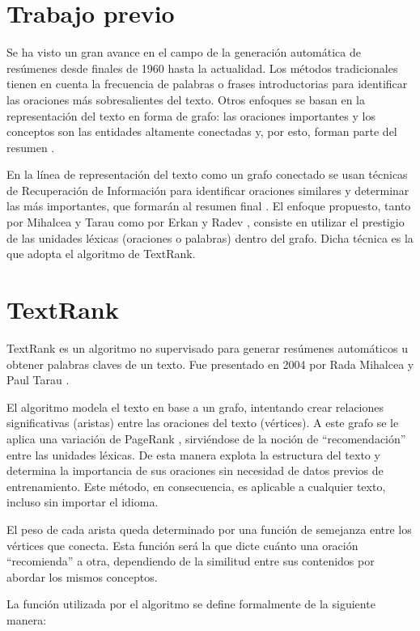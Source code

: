 \documentclass{llncs}
\begin{document}
\section{Trabajo previo}
Se ha visto un gran avance en el campo de la generación automática de resúmenes desde finales de 1960 hasta la actualidad. Los métodos tradicionales tienen en cuenta la frecuencia de palabras o frases introductorias para identificar las oraciones más sobresalientes del texto. Otros enfoques se basan en la representación del texto en forma de grafo: las oraciones importantes y los conceptos son las entidades altamente conectadas y, por esto, forman parte del resumen \cite{barzilay}. 

En la línea de representación del texto como un grafo conectado se usan técnicas de Recuperación de Información para identificar oraciones similares y determinar las más importantes, que formarán al resumen final \cite{salton}. El enfoque propuesto, tanto por Mihalcea y Tarau \cite{mihalcea-tarau} como por Erkan y Radev \cite{erkan}, consiste en utilizar el prestigio de las unidades léxicas (oraciones o palabras) dentro del grafo. Dicha técnica es la que adopta el algoritmo de TextRank.


\section{TextRank}

TextRank es un algoritmo no supervisado para generar resúmenes automáticos u obtener palabras claves de un texto. Fue presentado en 2004 por Rada Mihalcea y Paul Tarau \cite{mihalcea-tarau}.

El algoritmo modela el texto en base a un grafo, intentando crear relaciones significativas (aristas) entre las oraciones del texto (vértices). A este grafo se le aplica una variación de PageRank \cite{pageetal98}, sirviéndose de la noción de “recomendación” entre las unidades léxicas. De esta manera explota la estructura del texto y determina la importancia de sus oraciones sin necesidad de datos previos de entrenamiento. Este método, en consecuencia, es aplicable a cualquier texto, incluso sin importar el idioma.

El peso de cada arista queda determinado por una función de semejanza entre los vértices que conecta. Esta función será la que dicte cuánto una oración “recomienda” a otra, dependiendo de la similitud entre sus contenidos por abordar los mismos conceptos.
    
La función utilizada por el algoritmo se define formalmente de la siguiente manera:
\end{document}
